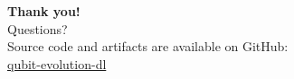 \begin{frame}[plain]
\vspace{1.2cm}
\centering
{\LARGE \textbf{Thank you!}}\\[0.6em]
{\large Questions?}\\[1.0em]

\small
Source code and artifacts are available on GitHub:\\
\href{https://github.com/GiuseppeRudi/qubit-evolution-dl}{qubit-evolution-dl}\\[0.6em]
\end{frame}